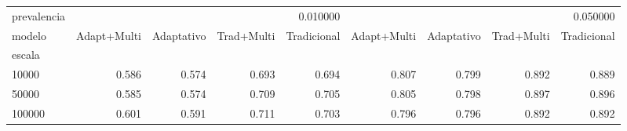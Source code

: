\begin{tabular}{lrrrrrrrr}
\toprule
prevalencia & \multicolumn{4}{r}{0.010000} & \multicolumn{4}{r}{0.050000} \\
modelo & Adapt+Multi & Adaptativo & Trad+Multi & Tradicional & Adapt+Multi & Adaptativo & Trad+Multi & Tradicional \\
escala &  &  &  &  &  &  &  &  \\
\midrule
10000 & 0.586 & 0.574 & 0.693 & 0.694 & 0.807 & 0.799 & 0.892 & 0.889 \\
50000 & 0.585 & 0.574 & 0.709 & 0.705 & 0.805 & 0.798 & 0.897 & 0.896 \\
100000 & 0.601 & 0.591 & 0.711 & 0.703 & 0.796 & 0.796 & 0.892 & 0.892 \\
\bottomrule
\end{tabular}
